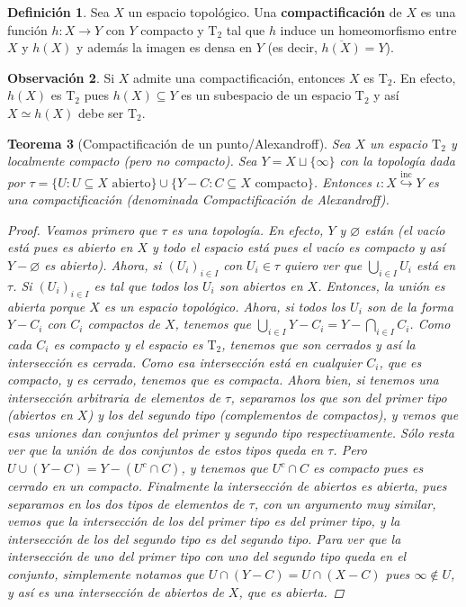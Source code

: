 \documentclass[12pt]{book}
\newtheorem{teo}{Teorema}[section]
\theoremstyle{definition}
\newtheorem{obs}[teo]{Observación}
\newtheorem{defn}[teo]{Definición}
\let\emptyset\varnothing
\begin{document}
\begin{defn}
Sea $X$ un espacio topológico. Una \textbf{compactificación} de $X$ es una función $h:X\to Y$ con $Y$ compacto y $\mathrm{T}_2$ tal que $h$ induce un homeomorfismo entre $X$ y $h(X)$ y además la imagen es densa en $Y$ (es decir, $\overline{h(X)}=Y$).
\end{defn}

\begin{obs}
Si $X$ admite una compactificación, entonces $X$ es $\mathrm{T}_2$. En efecto, $h(X)$ es $\mathrm{T}_2$ pues $h(X)\subseteq Y$ es un subespacio de un espacio $\mathrm{T}_2$ y así $X\simeq h(X)$ debe ser $\mathrm{T}_2$.
\end{obs}

\begin{teo}[Compactificación de un punto/Alexandroff] Sea $X$ un espacio $\mathrm{T}_2$ y localmente compacto (pero no compacto). Sea $Y=X\sqcup\{\infty\}$ con la topología dada por $\tau =\{U : U\subseteq X \text{ abierto}\} \cup \{Y-C : C\subseteq X\text{ compacto}\}$. Entonces $\iota:X\stackrel{\mathrm{inc}}{\hookrightarrow} Y$ es una compactificación (denominada Compactificación de Alexandroff).
\begin{proof}
Veamos primero que $\tau$ es una topología. En efecto, $Y$ y $\emptyset$ están (el vacío está pues es abierto en $X$ y todo el espacio está pues el vacío es compacto y así $Y-\emptyset$ es abierto). Ahora, si $(U_i)_{i\in I}$ con $U_i\in\tau$ quiero ver que $\displaystyle\bigcup_{i\in I}U_i$ está en $\tau$. Si $(U_i)_{i\in I}$ es tal que todos los $U_i$ son abiertos en $X$. Entonces, la unión es abierta porque $X$ es un espacio topológico. Ahora, si todos los $U_i$ son de la forma $Y-C_i$ con $C_i$ compactos de $X$, tenemos que $\displaystyle\bigcup_{i\in I}Y-C_i = Y - \displaystyle\bigcap_{i\in I}C_i$. Como cada $C_i$ es compacto y el espacio es $\mathrm{T}_2$, tenemos que son cerrados y así la intersección es cerrada. Como esa intersección está en cualquier $C_i$, que es compacto, y es cerrado, tenemos que es compacta. Ahora bien, si tenemos una intersección arbitraria de elementos de $\tau$, separamos los que son del primer tipo (abiertos en $X$) y los del segundo tipo (complementos de compactos), y vemos que esas uniones dan conjuntos del primer y segundo tipo respectivamente. Sólo resta ver que la unión de dos conjuntos de estos tipos queda en $\tau$. Pero $U\cup (Y-C) = Y - (U^c\cap C)$, y tenemos que $U^c\cap C$ es compacto pues es cerrado en un compacto. Finalmente la intersección de abiertos es abierta, pues separamos en los dos tipos de elementos de $\tau$, con un argumento muy similar, vemos que la intersección de los del primer tipo es del primer tipo, y la intersección de los del segundo tipo es del segundo tipo. Para ver que la intersección de uno del primer tipo con uno del segundo tipo queda en el conjunto, simplemente notamos que $U\cap (Y-C) = U\cap (X-C)$ pues $\infty\notin U$, y así es una intersección de abiertos de $X$, que es abierta.


\end{proof}
\end{teo}
\end{document}
